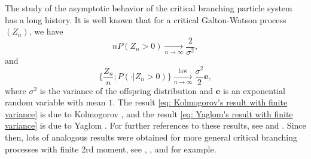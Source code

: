 \documentclass[12pt, a4paper]{amsart}
\theoremstyle{definition}
\numberwithin{equation}{section}
\begin{document}
	The study of the asymptotic behavior of the critical branching particle system has a long history.
	It is well known that for a critical Galton-Watson process $(Z_n)$, we have
	\[\label{eq: Kolmogorov's result with finite variance}
		n P(Z_n > 0)
		\xrightarrow[n\to \infty]{} \frac{2}{\sigma^2},
	\]
	and
	\[\label{eq: Yaglom's result with finite variance}
		\Big\{ \frac{Z_n}{n}; P(\cdot| Z_n > 0) \Big\}
		\xrightarrow[n \to \infty]{\operatorname{law}} \frac{\sigma^2}{2} \mathbf e,
	\]
	where $\sigma^2$ is the variance of the offspring distribution and $\mathbf e$ is an exponential random variable with mean $1$.
	The result \eqref{eq: Kolmogorov's result with finite variance} is due to Kolmogorov \cite{Kolmogorov1938Zur-losung}, and the result \eqref{eq: Yaglom's result with finite variance} is due to Yaglom \cite{Yaglom1947Certain}.
	For further references to these results, see \cite{Harris2002The-theory} and \cite{KestenNeySpitzer1966The-Galton-Watson}.
	Since then, lots of analogous results were obtained for more general critical branching processes with finite 2rd moment, see \cite{AsmussenHering1983Branching}, \cite{AthreyaNey1974Functionals}, \cite{AthreyaNey1972Branching} and \cite{JoffeSpitzer1967On-multitype} for example.
	
\end{document}
